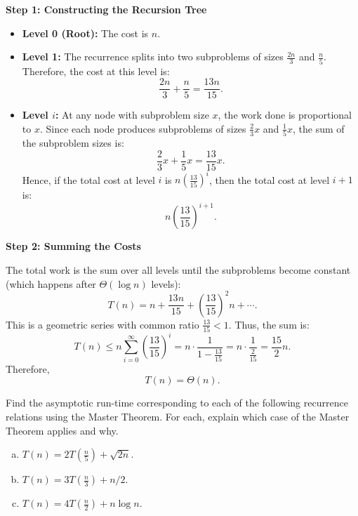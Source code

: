 \documentclass[11pt]{article}
\begin{document}
    \textbf{Step 1: Constructing the Recursion Tree}

    \begin{itemize}
        \item \textbf{Level 0 (Root):} The cost is \( n \).
        \item \textbf{Level 1:} The recurrence splits into two subproblems of sizes \(\frac{2n}{3}\) and \(\frac{n}{5}\). 
        Therefore, the cost at this level is:
        \[
        \frac{2n}{3} + \frac{n}{5} = \frac{13n}{15}.
        \]
        \item \textbf{Level \(i\):} At any node with subproblem size \( x \), the work done is proportional to \( x \). 
        Since each node produces subproblems of sizes \(\frac{2}{3}x\) and \(\frac{1}{5}x\), the sum of the subproblem sizes is:
        \[
        \frac{2}{3}x+\frac{1}{5}x = \frac{13}{15}x.
        \]
        Hence, if the total cost at level \(i\) is \( n\left(\frac{13}{15}\right)^i \), then the total cost at level \(i+1\) is:
        \[
        n\left(\frac{13}{15}\right)^{i+1}.
        \]
    \end{itemize}

    \textbf{Step 2: Summing the Costs}

    The total work is the sum over all levels until the subproblems become constant (which happens after \( \Theta(\log n) \) levels):
    \[
    T(n) = n + \frac{13n}{15} + \left(\frac{13}{15}\right)^2 n + \cdots.
    \]
    This is a geometric series with common ratio \( \frac{13}{15} < 1 \). Thus, the sum is:
    \[
    T(n) \le n \sum_{i=0}^{\infty}\left(\frac{13}{15}\right)^i
    = n \cdot \frac{1}{1-\frac{13}{15}}
    = n \cdot \frac{1}{\frac{2}{15}}
    = \frac{15}{2}n.
    \]
    Therefore,
    \[
    T(n) = \Theta(n).
    \]
    
    \newpage
    
    \begin{tcolorbox}[title={Problem 1C (12 pts)}]
        Find the asymptotic run-time corresponding to each of the following recurrence relations using the Master Theorem. For each, explain which case of the Master Theorem applies and why.
        \begin{enumerate}[(a)]
            \item $T(n) = 2T(\frac{n}{5}) + \sqrt{2n}$.
            \item $T(n) = 3T(\frac{n}{3}) + n/2$.
            \item $T(n) = 4T(\frac{n}{2}) + n\log n$.
        \end{enumerate}
    \end{tcolorbox}
\end{document}
